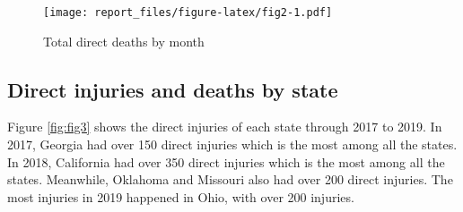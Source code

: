 \documentclass[
]{article}
\newenvironment{Shaded}{\begin{snugshade}}{\end{snugshade}}
\newcommand{\DataTypeTok}[1]{\textcolor[rgb]{0.13,0.29,0.53}{#1}}
\newcommand{\KeywordTok}[1]{\textcolor[rgb]{0.13,0.29,0.53}{\textbf{#1}}}
\newcommand{\NormalTok}[1]{#1}
\newcommand{\OperatorTok}[1]{\textcolor[rgb]{0.81,0.36,0.00}{\textbf{#1}}}
\newcommand{\OtherTok}[1]{\textcolor[rgb]{0.56,0.35,0.01}{#1}}
\newcommand{\StringTok}[1]{\textcolor[rgb]{0.31,0.60,0.02}{#1}}
\begin{document}
\begin{Shaded}
\end{Shaded}

\begin{figure}
\centering
\texttt{[image: report\_files/figure-latex/fig2-1.pdf]}
\caption{\label{fig:fig2}Total direct deaths by month}
\end{figure}

\clearpage

\hypertarget{direct-injuries-and-deaths-by-state}{%
\subsection{Direct injuries and deaths by state}\label{direct-injuries-and-deaths-by-state}}

Figure \ref{fig:fig3} shows the direct injuries of each state through 2017 to 2019. In 2017, Georgia had over 150 direct injuries which is the most among all the states. In 2018, California had over 350 direct injuries which is the most among all the states. Meanwhile, Oklahoma and Missouri also had over 200 direct injuries. The most injuries in 2019 happened in Ohio, with over 200 injuries.
\end{document}
